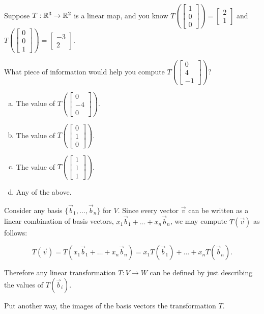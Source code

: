 \begin{activity}{5}
Suppose \(T: \mathbb{R}^3 \rightarrow \mathbb{R}^2\) is a linear map, and you know
\(
  T\left(\begin{bmatrix} 1 \\ 0 \\ 0 \end{bmatrix} \right)
=
  \begin{bmatrix} 2 \\ 1 \end{bmatrix}
\)
and
\(
  T\left(\begin{bmatrix} 0 \\ 0 \\ 1 \end{bmatrix} \right)
=
  \begin{bmatrix} -3 \\ 2 \end{bmatrix}
\).

What piece of information would help you compute \(T\left(\begin{bmatrix}0\\4\\-1\end{bmatrix}\right)\)?
\begin{multicols}{2}
\begin{enumerate}[(a)]
\item The value of \(T\left(\begin{bmatrix} 0\\-4\\0\end{bmatrix}\right)\).
\item The value of \(T\left(\begin{bmatrix} 0\\1\\0\end{bmatrix}\right)\).
\item The value of \(T\left(\begin{bmatrix} 1\\1\\1\end{bmatrix}\right)\).
\item Any of the above.
\end{enumerate}
\end{multicols}
\end{activity}

\begin{fact}
Consider any basis \(\{\vec b_1,\dots,\vec b_n\}\) for \(V\).  Since every
vector \(\vec v\) can be written as a linear combination of
basis vectors, \(x_1\vec b_1+\dots+ x_n\vec b_n\), we may compute
\(T(\vec v)\) as follows:

\[
  T(\vec v)=T(x_1\vec b_1+\dots+ x_n\vec b_n)=
  x_1T(\vec b_1)+\dots+x_nT(\vec b_n)
.\]

Therefore any linear transformation \(T:V \rightarrow W\) can be defined
by just describing the values of \(T(\vec b_i)\).

Put another way, the images of the basis vectors  the transformation \(T\).
\end{fact}

